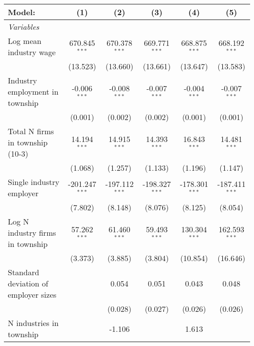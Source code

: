 \begingroup
\centering
\begin{tabular}{lccccc}
   \tabularnewline \midrule \midrule
   Model:                               & (1)              & (2)              & (3)              & (4)              & (5)\\  
   \midrule
   \emph{Variables}\\
   Log mean industry wage               & 670.845$^{***}$  & 670.378$^{***}$  & 669.771$^{***}$  & 668.875$^{***}$  & 668.192$^{***}$\\   
                                        & (13.523)         & (13.660)         & (13.661)         & (13.647)         & (13.583)\\   
   Industry employment in township      & -0.006$^{***}$   & -0.008$^{***}$   & -0.007$^{***}$   & -0.004$^{***}$   & -0.007$^{***}$\\   
                                        & (0.001)          & (0.002)          & (0.002)          & (0.001)          & (0.001)\\   
   Total N firms in township (10-3)     & 14.194$^{***}$   & 14.915$^{***}$   & 14.393$^{***}$   & 16.843$^{***}$   & 14.481$^{***}$\\   
                                        & (1.068)          & (1.257)          & (1.133)          & (1.196)          & (1.147)\\   
   Single industry employer             & -201.247$^{***}$ & -197.112$^{***}$ & -198.327$^{***}$ & -178.301$^{***}$ & -187.411$^{***}$\\   
                                        & (7.802)          & (8.148)          & (8.076)          & (8.125)          & (8.054)\\   
   Log N industry firms in township     & 57.262$^{***}$   & 61.460$^{***}$   & 59.493$^{***}$   & 130.304$^{***}$  & 162.593$^{***}$\\   
                                        & (3.373)          & (3.885)          & (3.804)          & (10.854)         & (16.646)\\   
   Standard deviation of employer sizes &                  & 0.054            & 0.051            & 0.043            & 0.048\\   
                                        &                  & (0.028)          & (0.027)          & (0.026)          & (0.026)\\   
   N industries in township             &                  & -1.106           &                  & 1.613            &   \\   

\end{tabular}

